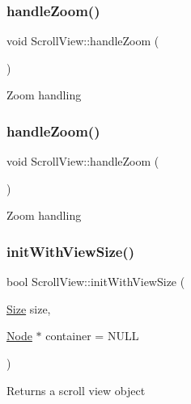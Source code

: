 \subsubsection{\texorpdfstring{handle\+Zoom()}{handleZoom()}\hspace{0.1cm}{\footnotesize\ttfamily [1/2]}}
{\footnotesize\ttfamily void Scroll\+View\+::handle\+Zoom (\begin{DoxyParamCaption}{ }\end{DoxyParamCaption})\hspace{0.3cm}{\ttfamily [protected]}}

Zoom handling \mbox{\label{classScrollView_a9eedb1e4515a77abc80fcfacb4638474}} 
\subsubsection{\texorpdfstring{handle\+Zoom()}{handleZoom()}\hspace{0.1cm}{\footnotesize\ttfamily [2/2]}}
{\footnotesize\ttfamily void Scroll\+View\+::handle\+Zoom (\begin{DoxyParamCaption}{ }\end{DoxyParamCaption})\hspace{0.3cm}{\ttfamily [protected]}}

Zoom handling \mbox{\label{classScrollView_ae672005fc1d0d8dd3605d85e9f41a1d4}} 
\subsubsection{\texorpdfstring{init\+With\+View\+Size()}{initWithViewSize()}\hspace{0.1cm}{\footnotesize\ttfamily [1/2]}}
{\footnotesize\ttfamily bool Scroll\+View\+::init\+With\+View\+Size (\begin{DoxyParamCaption}\item[{\hyperlink{classSize}{Size}}]{size,  }\item[{\hyperlink{classNode}{Node} $\ast$}]{container = {\ttfamily NULL} }\end{DoxyParamCaption})}

Returns a scroll view object


